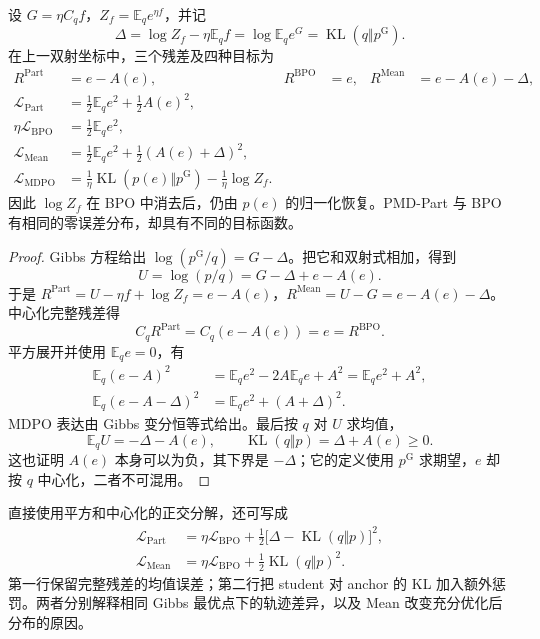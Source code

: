 \documentclass[lang=cn,scheme=chinese,openany]{../book/elegantbook}
\newcommand{\E}{\mathbb E}
\newcommand{\KL}{\operatorname{KL}}
\begin{document}
\begin{theorem}[四种目标在同一坐标中的精确表达]
\label{thm:quotient-losses}
设 $G=\eta C_qf$，$Z_f=\E_qe^{\eta f}$，并记
\begin{equation}
\Delta=\log Z_f-\eta\E_q f
=\log\E_q e^G=\KL(q\Vert p^{\mathrm G}).
\end{equation}
在上一双射坐标中，三个残差及四种目标为
\begin{align}
R^{\mathrm{Part}}&=e-A(e),&
R^{\mathrm{BPO}}&=e,&
R^{\mathrm{Mean}}&=e-A(e)-\Delta,\\
\mathcal L_{\mathrm{Part}}&=\tfrac12\E_qe^2+\tfrac12A(e)^2,\\
\eta\mathcal L_{\mathrm{BPO}}&=\tfrac12\E_qe^2,\\
\mathcal L_{\mathrm{Mean}}&=\tfrac12\E_qe^2+\tfrac12(A(e)+\Delta)^2,\\
\mathcal L_{\mathrm{MDPO}}&=\frac1\eta\KL(p(e)\Vert p^{\mathrm G})-\frac1\eta\log Z_f.
\label{eq:quotient-four-losses}
\end{align}
因此 $\log Z_f$ 在 BPO 中消去后，仍由 $p(e)$ 的归一化恢复。PMD-Part 与 BPO 有相同的零误差分布，却具有不同的目标函数。
\end{theorem}
\begin{proof}
Gibbs 方程给出 $\log(p^{\mathrm G}/q)=G-\Delta$。把它和双射式相加，得到
\begin{equation}
U=\log(p/q)=G-\Delta+e-A(e).
\end{equation}
于是 $R^{\mathrm{Part}}=U-\eta f+\log Z_f=e-A(e)$，$R^{\mathrm{Mean}}=U-G=e-A(e)-\Delta$。中心化完整残差得
\begin{equation}
C_qR^{\mathrm{Part}}=C_q(e-A(e))=e=R^{\mathrm{BPO}}.
\end{equation}
平方展开并使用 $\E_qe=0$，有
\begin{align}
\E_q(e-A)^2&=\E_qe^2-2A\E_qe+A^2=\E_qe^2+A^2,\\
\E_q(e-A-\Delta)^2&=\E_qe^2+(A+\Delta)^2.
\end{align}
MDPO 表达由 Gibbs 变分恒等式给出。最后按 $q$ 对 $U$ 求均值，
\begin{equation}
\E_qU=-\Delta-A(e),\qquad \KL(q\Vert p)=\Delta+A(e)\ge0.
\end{equation}
这也证明 $A(e)$ 本身可以为负，其下界是 $-\Delta$；它的定义使用 $p^{\mathrm G}$ 求期望，$e$ 却按 $q$ 中心化，二者不可混用。
\end{proof}

直接使用平方和中心化的正交分解，还可写成
\begin{align}
\mathcal L_{\mathrm{Part}}&=\eta\mathcal L_{\mathrm{BPO}}
+\tfrac12\bigl[\Delta-\KL(q\Vert p)\bigr]^2,\\
\mathcal L_{\mathrm{Mean}}&=\eta\mathcal L_{\mathrm{BPO}}
+\tfrac12\KL(q\Vert p)^2.
\label{eq:quotient-penalties}
\end{align}
第一行保留完整残差的均值误差；第二行把 student 对 anchor 的 KL 加入额外惩罚。两者分别解释相同 Gibbs 最优点下的轨迹差异，以及 Mean 改变充分优化后分布的原因。
\end{document}
